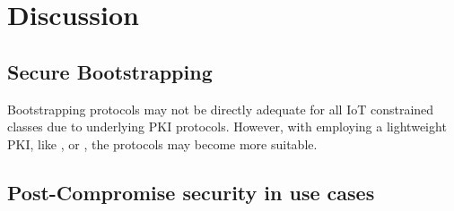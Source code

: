 \chapter{Discussion}
\label{ch:discussion}

\section{Secure Bootstrapping}
Bootstrapping protocols may not be directly adequate for all IoT constrained classes due to underlying PKI protocols. However, with employing a lightweight PKI, like \cite{hoglund2020pki4iot}, or \cite{won2018decentralized}, the protocols may become more suitable.

\section{Post-Compromise security in use cases}